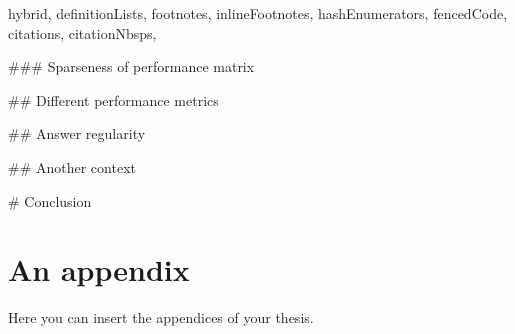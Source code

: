 \documentclass[
  digital, %
  table,   %
  nolof,     %
  nolot,     %
  nocover
]{fithesis3}
\begin{document}
\begin{markdown*}{%
  hybrid,
  definitionLists,
  footnotes,
  inlineFootnotes,
  hashEnumerators,
  fencedCode,
  citations,
  citationNbsps,
}

### Sparseness of performance matrix



## Different performance metrics



## Answer regularity










## Another context



# Conclusion




\end{markdown*}

  \makeatletter\thesis@blocks@clear\makeatother
  \printindex

\appendix %
\chapter{An appendix}
Here you can insert the appendices of your thesis.
\end{document}
